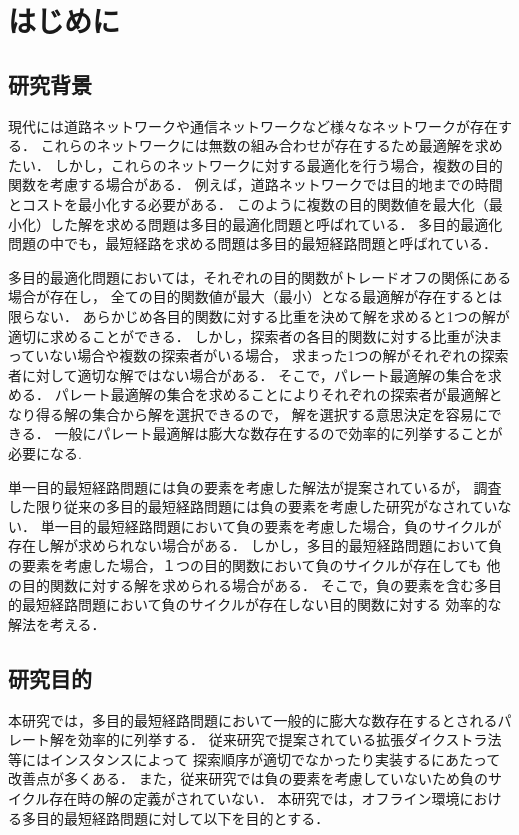 \documentclass[12pt]{optlab-bachelor}
\begin{document}
\frontmatter %
\chapter{はじめに}
\section{研究背景}
現代には道路ネットワークや通信ネットワークなど様々なネットワークが存在する．
これらのネットワークには無数の組み合わせが存在するため最適解を求めたい．
しかし，これらのネットワークに対する最適化を行う場合，複数の目的関数を考慮する場合がある．
例えば，道路ネットワークでは目的地までの時間とコストを最小化する必要がある．
このように複数の目的関数値を最大化（最小化）した解を求める問題は多目的最適化問題と呼ばれている．
多目的最適化問題の中でも，最短経路を求める問題は多目的最短経路問題と呼ばれている．

多目的最適化問題においては，それぞれの目的関数がトレードオフの関係にある場合が存在し，
全ての目的関数値が最大（最小）となる最適解が存在するとは限らない．
あらかじめ各目的関数に対する比重を決めて解を求めると1つの解が適切に求めることができる．
しかし，探索者の各目的関数に対する比重が決まっていない場合や複数の探索者がいる場合，
求まった1つの解がそれぞれの探索者に対して適切な解ではない場合がある．
そこで，パレート最適解の集合を求める．
パレート最適解の集合を求めることによりそれぞれの探索者が最適解となり得る解の集合から解を選択できるので，
解を選択する意思決定を容易にできる．
一般にパレート最適解は膨大な数存在するので効率的に列挙することが必要になる.

単一目的最短経路問題には負の要素を考慮した解法が提案されているが，
調査した限り従来の多目的最短経路問題には負の要素を考慮した研究がなされていない．
単一目的最短経路問題において負の要素を考慮した場合，負のサイクルが存在し解が求められない場合がある．
しかし，多目的最短経路問題において負の要素を考慮した場合，１つの目的関数において負のサイクルが存在しても
他の目的関数に対する解を求められる場合がある．
そこで，負の要素を含む多目的最短経路問題において負のサイクルが存在しない目的関数に対する
効率的な解法を考える．

\section{研究目的}
本研究では，多目的最短経路問題において一般的に膨大な数存在するとされるパレート解を効率的に列挙する．
従来研究で提案されている拡張ダイクストラ法等にはインスタンスによって
探索順序が適切でなかったり実装するにあたって改善点が多くある．
また，従来研究では負の要素を考慮していないため負のサイクル存在時の解の定義がされていない．
本研究では，オフライン環境における多目的最短経路問題に対して以下を目的とする．
\end{document}
